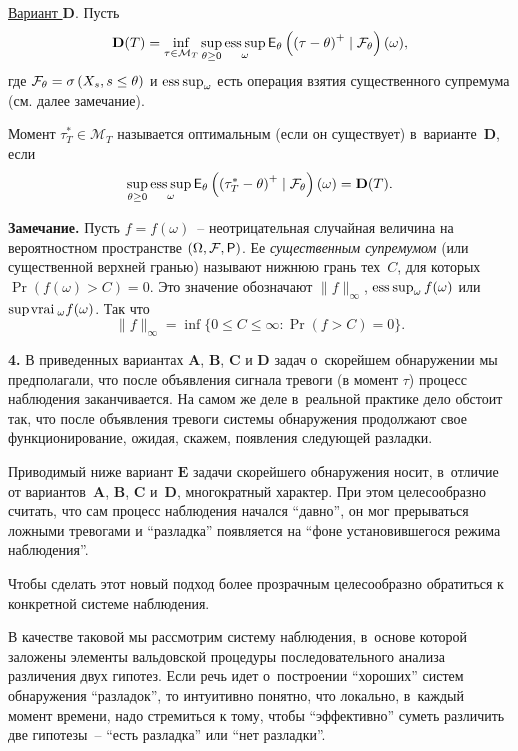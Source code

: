 \underline{Вариант $\mathbf{D}$}. Пусть
\begin{equation}
\label{200}%
\mathbf{D}(T)=\inf_{\tau\in\mathcal{M}_T}\sup_{\theta\ge0}\esssup_{\omega}
\E_{\theta}\left(\left(\tau-\theta\right)^+\mid\F_{\theta}\right)(\omega),
\end{equation}
где $\mathcal{F}_{\theta}=\sigma\left( X_s,s\le\theta\right)$ и
$\esssup_{\omega}$ есть операция взятия существенного супремума
(см. далее замечание).

Момент $\tau_T^*\in\mathcal{M}_T$ называется оптимальным (если он
существует) в~варианте~$\mathbf{D}$, если
\begin{equation}
\label{201}%
\sup_{\theta\ge0}\esssup_{\omega}
\E_{\theta}\left(\left(\tau_T^*-\theta\right)^+\mid\F_{\theta}\right)(\omega)=\mathbf{D}(T).
\end{equation}

\textbf{Замечание.} Пусть $f=f(\omega)$~-- неотрицательная
случайная величина на вероятностном пространстве
$\left(\Omega,\F,\Pr\right)$. Ее \textit{существенным супремумом} (или
существенной верхней гранью) называют нижнюю грань тех~$C$, для
которых $\Pr(f(\omega)>C)=0$. Это значение обозначают
$\|f\|_{\infty}$, $\esssup_{\omega}f(\omega)$ или
$\supvrai_{\omega}f(\omega)$. Так что
\[
\|f\|_{\infty}=\inf\{0\le C\le\infty\colon\Pr\left( f>C\right)=0\}.
\]

\textbf{4.} В приведенных вариантах $\mathbf{A}$, $\mathbf{B}$,
$\mathbf{C}$ и $\mathbf{D}$ задач о~скорейшем обнаружении мы
предполагали, что после объявления сигнала тревоги (в момент
$\tau$) процесс наблюдения заканчивается. На самом же деле
в~реальной практике дело обстоит так, что после объявления тревоги
системы обнаружения продолжают  свое функционирование, ожидая,
скажем, появления следующей разладки.

Приводимый ниже вариант $\mathbf{E}$ задачи скорейшего обнаружения
носит, в~отличие от вариантов~$\mathbf{A}$, $\mathbf{B}$,
$\mathbf{C}$ и~$\mathbf{D}$, многократный характер. При этом
целесообразно считать, что сам процесс наблюдения начался
``давно'', он мог прерываться ложными тревогами и ``разладка''
появляется на ``фоне установившегося режима наблюдения''.

Чтобы сделать этот новый  подход более прозрачным целесообразно
обратиться к конкретной системе наблюдения.

В качестве таковой мы рассмотрим систему наблюдения, в~основе
которой заложены элементы вальдовской процедуры последовательного
анализа различения двух гипотез. Если речь идет о~построении
``хороших'' систем обнаружения ``разладок'', то интуитивно
понятно, что локально, в~каждый момент времени, надо стремиться к
тому, чтобы ``эффективно'' суметь различить две гипотезы~-- ``есть
разладка'' или ``нет разладки''.

